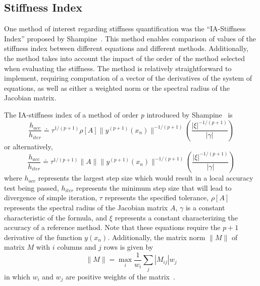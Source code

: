 \documentclass[12pt]{ussci}
\begin{document}
\subsection{Stiffness Index}

One method of interest regarding stiffness quantification was the ``IA-Stiffness Index'' proposed by Shampine~\cite{Shampine1982}.
This method enables comparison of values of the stiffness index between different equations and different methods.
Additionally, the method takes into account the impact of the order of the method selected when evaluating the stiffness.
The method is relatively straightforward to implement, requiring computation of a vector of the derivatives of the system of equations, as well as either a weighted norm or the spectral radius of the Jacobian matrix.

The IA-stiffness index of a method of order \textit{p} introduced by Shampine~\cite{Shampine1982} is
\begin{equation}
    \frac{h_{acc}}{h_{iter}} \doteq \tau ^ {1/(p + 1)} \rho [A] \|y^{(p+1)}(x_n)\|^{-1/(p+1)} \left( \frac{|\xi|^{-1/(p+1)}}{|\gamma|} \right)
\end{equation}
or alternatively,
\begin{equation}
    \frac{h_{acc}}{h_{iter}} \doteq \tau ^ {1/(p + 1)} \|A\|\|y^{(p+1)}(x_n)\|^{-1/(p+1)} \left( \frac{|\xi|^{-1/(p+1)}}{|\gamma|} \right)
\end{equation}
where $h_{acc}$ represents the largest step size which would result in a local accuracy test being passed, $h_{iter}$ represents the minimum step size that will lead to divergence of simple iteration, $\tau$ represents the specified tolerance, $\rho [A]$ represents the spectral radius of the Jacobian matrix $A$, $\gamma$ is a constant characteristic of the formula, and $\xi$ represents a constant characterizing the accuracy of a reference method.
Note that these equations require the $p+1$ derivative of the function $y(x_n)$.
Additionally, the matrix norm $\|M\|$ of matrix $M$ with $i$ columns and $j$ rows is given by
\begin{equation}
    \|M\| = \max_{i} \frac{1}{w_i} \sum_{j} |M_{ij}|w_j
\end{equation}
in which \(w_i\) and \(w_j\) are positive weights of the matrix~\cite{Shampine1985}.
\end{document}
